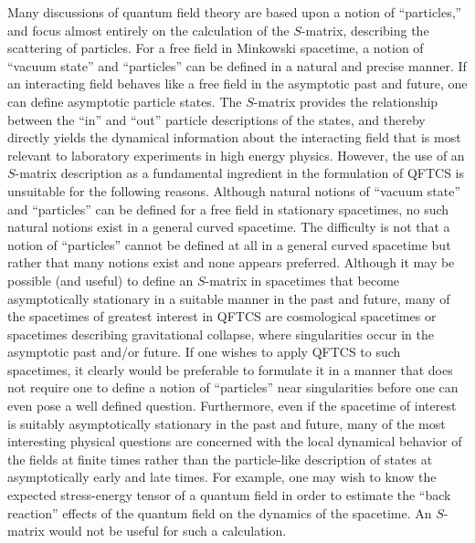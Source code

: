 \documentclass[12pt]{article}
\theoremstyle{plain}
\theoremstyle{definition}
\begin{document}
Many discussions of quantum field theory are based upon a notion of ``particles,'' and focus almost entirely on the calculation of the $S$-matrix, describing the scattering of particles. For a free field in Minkowski spacetime, a notion of ``vacuum state'' and ``particles'' can be defined in a natural and precise manner. If an interacting field behaves like a free field in the asymptotic past and future, one can define asymptotic particle states. The $S$-matrix provides the relationship between the ``in'' and ``out'' particle descriptions of the states, and thereby directly yields the dynamical information about the interacting field that is most relevant to laboratory experiments in high energy physics. However, the use of an $S$-matrix description as a fundamental ingredient in the formulation of QFTCS is unsuitable for the following reasons. Although natural notions of ``vacuum state'' and ``particles'' can be defined for a free field in stationary spacetimes, no such natural notions exist in a general curved spacetime. The difficulty is not that a notion of ``particles'' cannot be defined at all in a general curved spacetime but rather that many notions exist and none appears preferred. Although it may be possible (and useful) to define an $S$-matrix in spacetimes that become asymptotically stationary in a suitable manner in the past and future, many of the spacetimes of greatest interest in QFTCS are cosmological spacetimes or spacetimes describing gravitational collapse, where singularities occur in the asymptotic past and/or future. If one wishes to apply QFTCS to such spacetimes, it clearly would be preferable to formulate it in a manner that does not require one to define a notion of ``particles'' near singularities before one can even pose a well defined question. Furthermore, even if the spacetime of interest is suitably asymptotically stationary in the past and future, many of the most interesting physical questions are concerned with the local dynamical behavior of the fields at finite times rather than the particle-like description of states at asymptotically early and late times. For example, one may wish to know the expected stress-energy tensor of a quantum field in order to estimate the ``back reaction'' effects of the quantum field on the dynamics of the spacetime. An $S$-matrix would not be useful for such a calculation.
\end{document}
